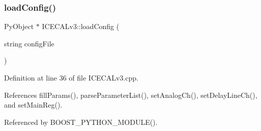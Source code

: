 \subsubsection{\texorpdfstring{load\+Config()}{loadConfig()}}
{\footnotesize\ttfamily Py\+Object $\ast$ I\+C\+E\+C\+A\+Lv3\+::load\+Config (\begin{DoxyParamCaption}\item[{string}]{config\+File }\end{DoxyParamCaption})}



Definition at line 36 of file I\+C\+E\+C\+A\+Lv3.\+cpp.



References fill\+Params(), parse\+Parameter\+List(), set\+Analog\+Ch(), set\+Delay\+Line\+Ch(), and set\+Main\+Reg().



Referenced by B\+O\+O\+S\+T\+\_\+\+P\+Y\+T\+H\+O\+N\+\_\+\+M\+O\+D\+U\+L\+E().


